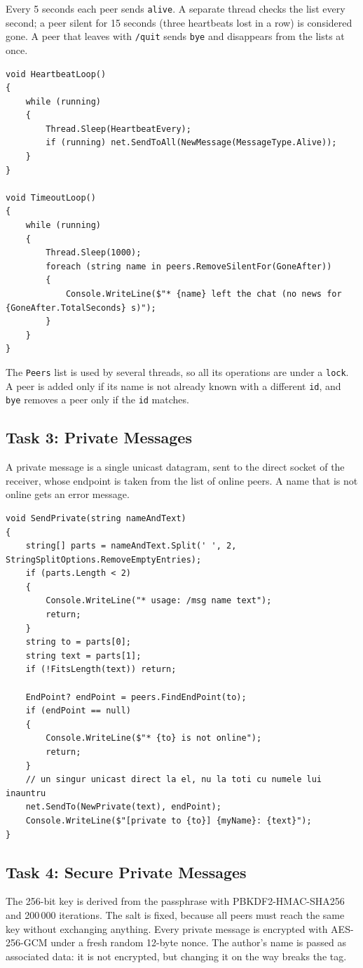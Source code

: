 \documentclass[11pt, a4paper]{article}
\begin{document}
Every 5 seconds each peer sends \texttt{alive}. A separate thread checks the list every second; a peer silent for 15 seconds (three heartbeats lost in a row) is considered gone. A peer that leaves with \texttt{/quit} sends \texttt{bye} and disappears from the lists at once.

\begin{lstlisting}[caption={Heartbeat and timeout}]
void HeartbeatLoop()
{
    while (running)
    {
        Thread.Sleep(HeartbeatEvery);
        if (running) net.SendToAll(NewMessage(MessageType.Alive));
    }
}

void TimeoutLoop()
{
    while (running)
    {
        Thread.Sleep(1000);
        foreach (string name in peers.RemoveSilentFor(GoneAfter))
        {
            Console.WriteLine($"* {name} left the chat (no news for {GoneAfter.TotalSeconds} s)");
        }
    }
}
\end{lstlisting}

The \texttt{Peers} list is used by several threads, so all its operations are under a \texttt{lock}. A peer is added only if its name is not already known with a different \texttt{id}, and \texttt{bye} removes a peer only if the \texttt{id} matches.

\subsection{Task 3: Private Messages}
A private message is a single unicast datagram, sent to the direct socket of the receiver, whose endpoint is taken from the list of online peers. A name that is not online gets an error message.

\begin{lstlisting}[caption={Sending a private message}]
void SendPrivate(string nameAndText)
{
    string[] parts = nameAndText.Split(' ', 2, StringSplitOptions.RemoveEmptyEntries);
    if (parts.Length < 2)
    {
        Console.WriteLine("* usage: /msg name text");
        return;
    }
    string to = parts[0];
    string text = parts[1];
    if (!FitsLength(text)) return;

    EndPoint? endPoint = peers.FindEndPoint(to);
    if (endPoint == null)
    {
        Console.WriteLine($"* {to} is not online");
        return;
    }
    // un singur unicast direct la el, nu la toti cu numele lui inauntru
    net.SendTo(NewPrivate(text), endPoint);
    Console.WriteLine($"[private to {to}] {myName}: {text}");
}
\end{lstlisting}

\subsection{Task 4: Secure Private Messages}
The 256-bit key is derived from the passphrase with PBKDF2-HMAC-SHA256 and 200\,000 iterations. The salt is fixed, because all peers must reach the same key without exchanging anything. Every private message is encrypted with AES-256-GCM under a fresh random 12-byte nonce. The author's name is passed as associated data: it is not encrypted, but changing it on the way breaks the tag.
\end{document}
